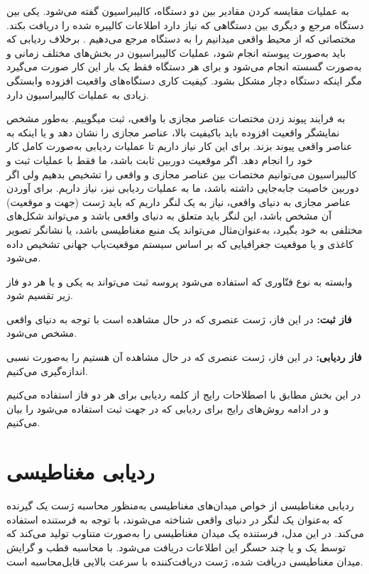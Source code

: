 به عملیات مقایسه کردن مقادیر بین دو دستگاه، کالیبراسیون گفته می‌شود. یکی بین دستگاه مرجع و دیگری بین دستگاهی که نیاز دارد اطلاعات کالیبره شده را دریافت بکند. مختصاتی که از محیط واقعی میدانیم را به دستگاه مرجع می‌دهیم  . برخلاف ردیابی که باید به‌صورت پیوسته انجام شود، عملیات کالیبراسیون در بخش‌های مختلف زمانی و به‌صورت گسسته انجام می‌شود و برای هر دستگاه فقط یک بار این کار صورت می‌گیرد مگر اینکه دستگاه دچار مشکل بشود. کیفیت کاری دستگاه‌های واقعیت افزوده وابستگی زیادی به عملیات کالیبراسیون دارد\cite{siltanen2012theory}.

به فرایند پیوند زدن مختصات عناصر مجازی با واقعی، ثبت میگوییم. به‌طور مشخص نمایشگر واقعیت افزوده باید باکیفیت بالا، عناصر مجازی را نشان دهد و یا اینکه به عناصر واقعی پیوند بزند. برای این کار نیاز داریم تا عملیات ردیابی به‌صورت کامل کار خود را انجام دهد. اگر موقعیت دوربین ثابت باشد، ما فقط با عملیات ثبت و کالیبراسیون می‌توانیم مختصات بین عناصر مجازی و واقعی را تشخیص بدهیم ولی اگر دوربین خاصیت جابه‌جایی داشته باشد، ما به عملیات ردیابی نیز، نیاز داریم\cite{siltanen2012theory}.
برای آوردن عناصر مجازی به دنیای واقعی، نیاز به یک لنگر داریم که باید ژست (جهت و موقعیت) آن مشخص باشد، این لنگر باید متعلق به دنیای واقعی باشد و می‌تواند شکل‌های مختلفی به خود بگیرد، به‌عنوان‌مثال می‌تواند یک منبع مغناطیسی باشد، یا نشانگر تصویر کاغذی و یا موقعیت جغرافیایی که بر اساس سیستم موقعیت‌یاب جهانی تشخیص داده می‌شود.

وابسته به نوع فنّاوری که استفاده می‌شود پروسه ثبت می‌تواند به یکی و یا هر دو فاز زیر تقسیم شود.


\textbf{فاز ثبت:}
در این فاز، ژست عنصری که در حال مشاهده است با توجه به دنیای واقعی مشخص می‌شود.

\textbf{فاز ردیابی:}
در این فاز، ژست عنصری که در حال مشاهده آن هستیم را به‌صورت نسبی اندازه‌گیری می‌کنیم.

در این بخش مطابق با اصطلاحات رایج از کلمه ردیابی برای هر دو فاز استفاده می‌کنیم و در ادامه روش‌های رایج برای ردیابی که در جهت ثبت استفاده می‌شود را بیان می‌کنیم.
\section{ردیابی مغناطیسی\protect{}}
ردیابی مغناطیسی از خواص میدان‌های مغناطیسی به‌منظور محاسبه ژست یک گیرنده  که به‌عنوان یک لنگر در دنیای واقعی شناخته می‌شوند، با توجه به فرستنده استفاده می‌کند. در این مدل، فرستنده یک میدان مغناطیسی را به‌صورت متناوب تولید می‌کند که توسط یک و یا چند حسگر این اطلاعات دریافت می‌شود. با محاسبه قطب و گرایش میدان مغناطیسی دریافت شده، ژست دریافت‌کننده با سرعت بالایی قابل‌محاسبه است.

